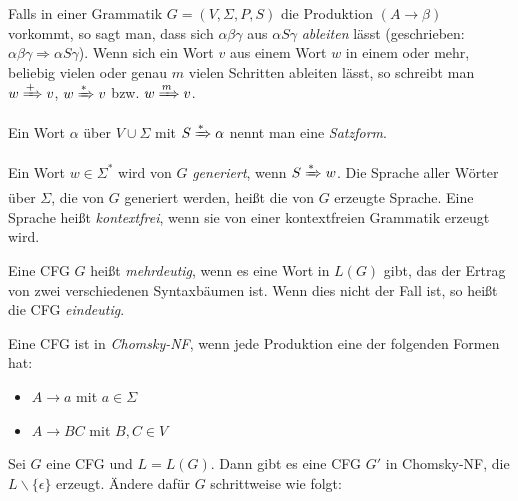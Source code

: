 \documentclass{cheat-sheet}
\begin{document}
\begin{definition}
Falls in einer Grammatik $G = (V, \Sigma, P, S)$ die Produktion $(A \longrightarrow \beta)$ vorkommt, so sagt man, dass sich $\alpha \beta \gamma$ aus $\alpha S \gamma$ \emph{ableiten} lässt (geschrieben: $\alpha \beta \gamma \Rightarrow \alpha S \gamma $). Wenn sich ein Wort $v$ aus einem Wort $w$ in einem oder mehr, beliebig vielen oder genau $m$ vielen Schritten ableiten lässt, so schreibt man $w \xRightarrow{+} v$, $w \xRightarrow{*} v$ bzw. $w \xRightarrow{m} v$.
\end{definition}

\begin{definition}
Ein Wort $\alpha$ über $V \cup \Sigma$ mit $S \xRightarrow{*} \alpha$ nennt man eine \emph{Satzform}.
\end{definition}

\begin{definition}
Ein Wort $w \in \Sigma^{*}$ wird von $G$ \emph{generiert}, wenn $S \xRightarrow[]{*} w$. Die Sprache aller Wörter über $\Sigma$, die von $G$ generiert werden, heißt die von $G$ erzeugte Sprache. Eine Sprache heißt \emph{kontextfrei}, wenn sie von einer kontextfreien Grammatik erzeugt wird.
\end{definition}


\begin{definition}
  Eine CFG $G$ heißt \emph{mehrdeutig}, wenn es eine Wort in $L(G)$ gibt, das der Ertrag von zwei verschiedenen Syntaxbäumen ist. Wenn dies nicht der Fall ist, so heißt die CFG \emph{eindeutig}.
\end{definition}

\fbox{
  \begin{minipage}{8.5cm}
    \hfill\vspace{2.5cm}
  \end{minipage}
}

\begin{definition}
  Eine CFG ist in \emph{Chomsky-NF}, wenn jede Produktion eine der folgenden Formen hat:
  \begin{itemize}
    \item $A \longrightarrow a$ mit $a \in \Sigma$
    \item $A \longrightarrow BC$ mit $B, C \in V$
  \end{itemize}
\end{definition}

\begin{alg}
Sei $G$ eine CFG und $L = L(G)$. Dann gibt es eine CFG $G'$ in Chomsky-NF, die $L \backslash \{ \epsilon \}$ erzeugt. Ändere dafür $G$ schrittweise wie folgt:
\end{alg}
\end{document}
